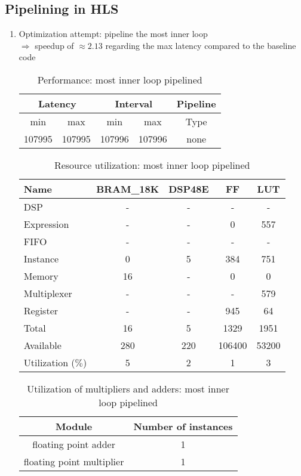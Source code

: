 \documentclass[../main.tex]{subfiles}
\begin{document}
\subsection{Pipelining in HLS}
\label{1-b}
\begin{enumerate}
	\item Optimization attempt: pipeline the most inner loop \\
		$\Rightarrow$ speedup of $\approx 2.13$ regarding the max latency compared to the baseline code
	\begin{table}[H]
		\centering
		\begin{tabular}{ccccc}
			\multicolumn{2}{c}{Latency} & \multicolumn{2}{c}{Interval} & Pipeline\\
			\hline
			min  &   max  &   min  &   max  &   Type  \\
			107995&  107995&  107996&  107996&   none  
		\end{tabular}
		\caption{Performance: most inner loop pipelined}
		\label{1-b-perf-table-1}
	\end{table}

	\begin{table}[H]
	\centering
	\begin{tabular}{lcccc}
		Name      & BRAM\_18K& DSP48E&   FF   &  LUT  \\
		\hline
		DSP              &        -&      -&       -&      -\\
		Expression       &        -&      -&       0&    557\\
		FIFO             &        -&      -&       -&      -\\
		Instance         &        0&      5&     384&    751\\
		Memory           &       16&      -&       0&      0\\
		Multiplexer      &        -&      -&       -&    579\\
		Register         &        -&      -&     945&     64\\
		\hline
		Total            &       16&      5&    1329&   1951\\
		Available        &      280&    220&  106400&  53200\\
		\hline
		Utilization ($\%$)  &        5&      2&       1&      3
	\end{tabular}
	\caption{Resource utilization: most inner loop pipelined}
	\label{1-b-resources-1}
	\end{table}

	\begin{table}[H]
		\centering
		\begin{tabular}{cc}
			Module & Number of instances \\
			\hline
			floating point adder & 1 \\
			floating point multiplier & 1
		\end{tabular}
		\caption{Utilization of multipliers and adders: most inner loop pipelined}
		\label{1-a-resources-arithmetic-1}
	\end{table}



\end{enumerate}
\end{document}
